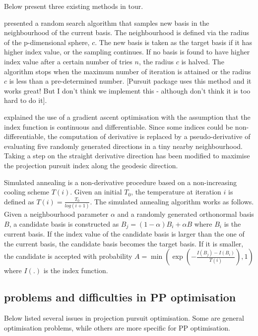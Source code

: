 \documentclass[12pt]{article}
\begin{document}
Below present three existing methods in tour.

\citet{posse1995projection} presented a random search algorithm that
samples new basis in the neighbourhood of the current basis. The
neighbourhood is defined via the radius of the p-dimensional sphere,
\(c\). The new basis is taken as the target basis if it has higher index
value, or the sampling continues. If no basis is found to have higher
index value after a certain number of tries \(n\), the radius \(c\) is
halved. The algorithm stops when the maximum number of iteration is
attained or the radius \(c\) is less than a pre-determined number.
{[}Pursuit package uses this method and it works great! But I don't
think we implement this - although don't think it is too hard to do
it{]}.

\citet{cook1995grand} explained the use of a gradient ascent
optimisation with the assumption that the index function is continuous
and differentiable. Since some indices could be non-differentiable, the
computation of derivative is replaced by a pseudo-derivative of
evaluating five randomly generated directions in a tiny nearby
neighbourhood. Taking a step on the straight derivative direction has
been modified to maximise the projection pursuit index along the
geodesic direction.

Simulated annealing
\citep[\citet{kirkpatrick1983optimization}]{bertsimas1993simulated} is a
non-derivative procedure based on a non-increasing cooling scheme
\(T(i)\). Given an initial \(T_0\), the temperature at iteration \(i\)
is defined as \(T(i) = \frac{T_0}{log(i + 1)}\). The simulated annealing
algorithm works as follows. Given a neighbourhood parameter \(\alpha\)
and a randomly generated orthonormal basis \(B\), a candidate basis is
constructed as \(B_j = (1- \alpha)B_i + \alpha B\) where \(B_i\) is the
current basis. If the index value of the candidate basis is larger than
the one of the current basis, the candidate basis becomes the target
basis. If it is smaller, the candidate is accepted with probability
\(A = \min \left(\exp(-\frac{I(B_j) - I(B_i)}{T(i)}), 1 \right)\) where
\(I(.)\) is the index function.

\hypertarget{problems-and-difficulties-in-pp-optimisation}{%
\subsection{problems and difficulties in PP
optimisation}\label{problems-and-difficulties-in-pp-optimisation}}

Below listed several issues in projection pursuit optimisation. Some are
general optimisation problems, while others are more specific for PP
optimisation.
\end{document}
